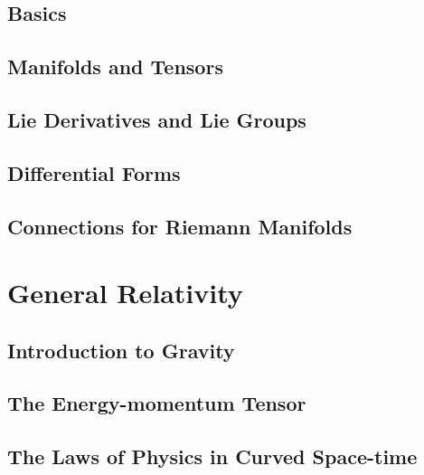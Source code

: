 \documentclass{momento}
\begin{document}
\chapter{Basics}
\label{cha:basics}



\chapter{Manifolds and Tensors}
\label{cha:manifolds-tensors}



\chapter{Lie Derivatives and Lie Groups}
\label{cha:lie-derivatives-lie}



\chapter{Differential Forms}
\label{cha:differential-forms}



\chapter{Connections for Riemann Manifolds}
\label{cha:conn-riem-manif}


\part{General Relativity}
\label{part:general-relativity}

\chapter{Introduction to Gravity}
\label{cha:introduction-gravity}


\chapter{The Energy-momentum Tensor}
\label{cha:energy-moment-tens}


\chapter{The Laws of Physics in Curved Space-time}
\label{cha:laws-physics-curved}

\end{document}
